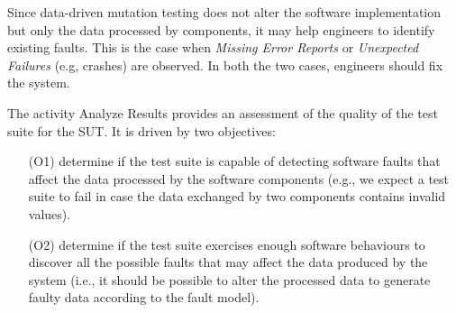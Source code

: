 Since data-driven mutation testing does not alter the software implementation but only the data processed by components, it may help engineers to identify existing faults. 
This is the case when \emph{Missing Error Reports} or \emph{Unexpected Failures }(e.g, crashes) are observed. In both the two cases, engineers should fix the system.

The activity Analyze Results provides an assessment of the quality of the test suite for the SUT.
It is driven by two objectives:
\begin{itemize}
\item[(O1)] determine if the test suite is capable of detecting software faults that affect the data processed by the software components 
(e.g., we expect a test suite to fail in case the data exchanged by two components contains invalid values).
\item[(O2)] determine if the test suite exercises enough software behaviours to discover all the possible faults that may affect the data produced by the system
(i.e., it should be possible to alter the processed data to generate faulty data according to the fault model). 
\end{itemize}

